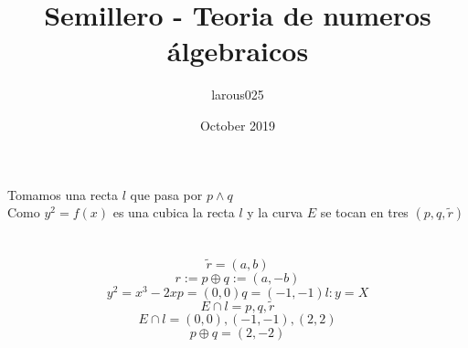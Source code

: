 \documentclass{article}
\title{Semillero - Teoria de numeros álgebraicos}
\author{larous025 }
\date{October 2019}
\begin{document}
\maketitle

\section{}
Tomamos una recta $l$ que pasa por $p \land q$ \\
Como $y^2 = f(x)$ es una cubica la recta $l$ y la curva $E$ se tocan en tres $(p,q,\widetilde{r})$ 
\section{}
\begin{equation*}
\widetilde{r}=(a,b)     
\end{equation*}
\begin{equation*}
    r:= p \oplus q := (a,-b)
\end{equation*}
\begin{equation*}
    y^2=x^3-2x p=(0,0) q=(-1,-1) l: y=X
\end{equation*}
\begin{equation*}
    E \cap l = {p,q,\widetilde{r}}
\end{equation*}
\begin{equation*}
    E \cap l = {(0,0),(-1,-1),(2,2)}
\end{equation*}
\begin{equation*}
    p \oplus q=(2,-2)
\end{equation*}
\section{}
\end{document}
